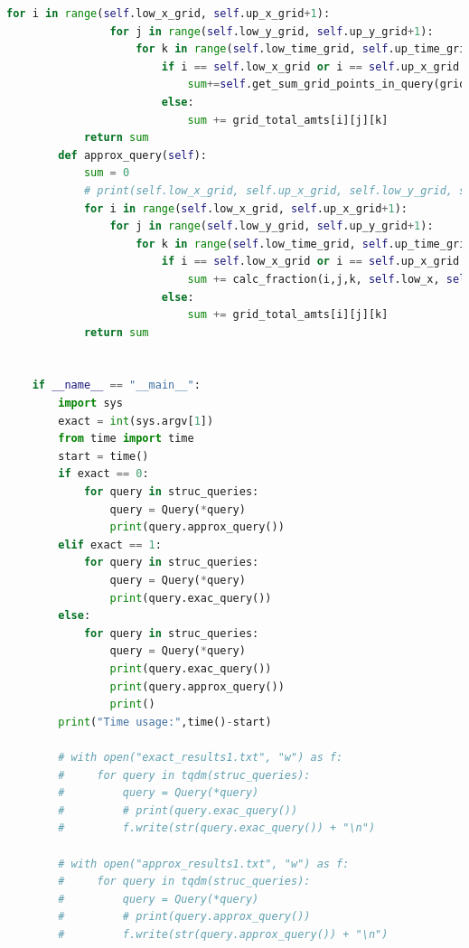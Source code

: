 \documentclass{article}
\begin{document}
\begin{lstlisting}[language=Python, caption=Task 2, label=task2, breaklines=true]
            for i in range(self.low_x_grid, self.up_x_grid+1):
                for j in range(self.low_y_grid, self.up_y_grid+1):
                    for k in range(self.low_time_grid, self.up_time_grid+1):
                        if i == self.low_x_grid or i == self.up_x_grid or j == self.low_y_grid or j == self.up_y_grid or k == self.low_time_grid or k == self.up_time_grid:
                            sum+=self.get_sum_grid_points_in_query(grid[i][j][k])
                        else:
                            sum += grid_total_amts[i][j][k]
            return sum
        def approx_query(self):
            sum = 0
            # print(self.low_x_grid, self.up_x_grid, self.low_y_grid, self.up_y_grid, self.low_time_grid, self.up_time_grid)
            for i in range(self.low_x_grid, self.up_x_grid+1):
                for j in range(self.low_y_grid, self.up_y_grid+1):
                    for k in range(self.low_time_grid, self.up_time_grid+1):
                        if i == self.low_x_grid or i == self.up_x_grid or j == self.low_y_grid or j == self.up_y_grid or k == self.low_time_grid or k == self.up_time_grid:
                            sum += calc_fraction(i,j,k, self.low_x, self.up_x, self.low_y, self.up_y, self.low_time, self.up_time)*grid_total_amts[i][j][k]
                        else:
                            sum += grid_total_amts[i][j][k]
            return sum
        
    
    if __name__ == "__main__":
        import sys
        exact = int(sys.argv[1])
        from time import time
        start = time()
        if exact == 0:
            for query in struc_queries:
                query = Query(*query)
                print(query.approx_query())
        elif exact == 1:
            for query in struc_queries:
                query = Query(*query)
                print(query.exac_query())
        else:
            for query in struc_queries:
                query = Query(*query)
                print(query.exac_query())
                print(query.approx_query())
                print()
        print("Time usage:",time()-start)
    
        # with open("exact_results1.txt", "w") as f:
        #     for query in tqdm(struc_queries):
        #         query = Query(*query)
        #         # print(query.exac_query())
        #         f.write(str(query.exac_query()) + "\n")
                
        # with open("approx_results1.txt", "w") as f:
        #     for query in tqdm(struc_queries):
        #         query = Query(*query)
        #         # print(query.approx_query())
        #         f.write(str(query.approx_query()) + "\n")
            
\end{lstlisting}
\end{document}
